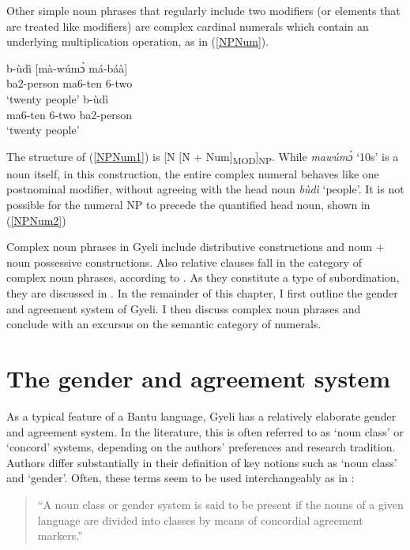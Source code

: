Other simple noun phrases that regularly include two modifiers (or elements that are treated like modifiers) are complex cardinal numerals which contain an underlying multiplication operation, as in (\ref{NPNum}). 

\begin{exe}
\ex\label{NPNum}
\begin{xlist}
\ex \label{NPNum1}
  \gll     b-ùdì [mà-wúmɔ̀ má-báà] \\
                ba2-person ma6-ten 6-two \\
    \trans `twenty people'
\ex\label{NPNum2}
 \gll    *[mà-wúmɔ̀ má-báà] b-ùdì \\
                ma6-ten 6-two ba2-person \\
    \trans `twenty people'
\end {xlist}
\end {exe}

\noindent The structure of (\ref{NPNum1}) is [N $[$N + Num$]$\textsubscript{MOD}]\textsubscript{NP}. While {\itshape mawúmɔ̀} `10s' is a noun itself, in this construction, the entire complex numeral behaves like one postnominal modifier, without agreeing with the head noun {\itshape bùdì} `people'.  It is not possible for the numeral NP to precede the quantified head noun, shown in (\ref{NPNum2})


Complex noun phrases in Gyeli include distributive constructions and noun + noun possessive constructions. Also relative clauses fall in the category of complex noun phrases, according to \citet{dryer2007}. As they constitute a type of subordination, they are discussed in .   In the remainder of this chapter, I first outline the gender and agreement system of Gyeli. I then discuss complex noun phrases and conclude with an excursus on the semantic category of numerals. 








\section{The gender and agreement system}
\label{sec:Gender}

As a typical feature of a Bantu language, Gyeli has a relatively elaborate gender and agreement system. In the literature, this is often referred to as `noun class' or `concord' systems, depending on the authors' preferences and research tradition. Authors differ substantially in their definition of key notions such as `noun class' and `gender'. Often, these terms seem to be used interchangeably as in \citet[190]{heine82}:
\begin{quote}
``A noun class or gender system is said to be present if the nouns of a given language are divided into classes by means of concordial agreement markers.''
\end{quote}

